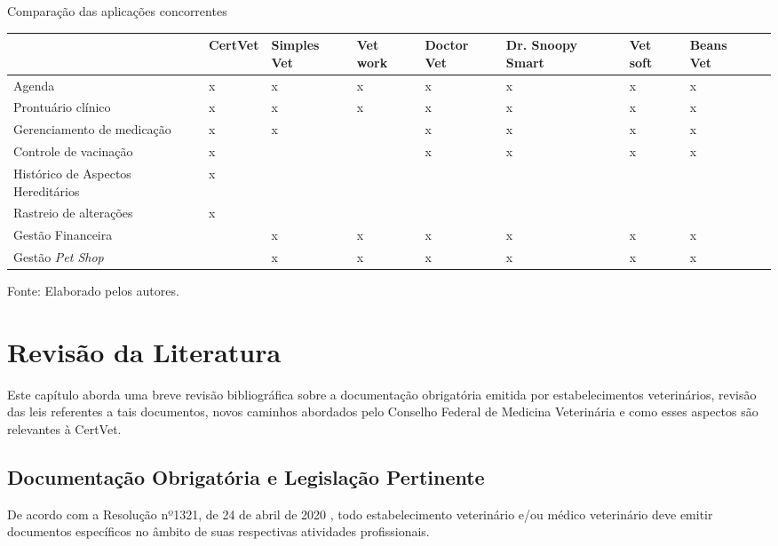 \documentclass[
    12pt,               %
    openright,          %
    oneside,
    a4paper,            %
    BIBLATEX,           %
    TODO,               %
    english,            %
    brazil              %
    ]{ifsp-spo-inf-ctds}
\begin{document}
    \begin{center}
    \begin{quadro}[H]
     \caption{Comparação das aplicações concorrentes}
    \label{tab:comparativa}
    \begin{tabulary}{1.0\textwidth}{|L|L|L|L|L|L|L|L|L|}
    \hline
     & CertVet & Simples Vet & Vet work & Doctor Vet & Dr. Snoopy Smart & Vet soft & Beans Vet\\
    \hline
    Agenda & x & x & x & x & x & x & x\\
    \hline
    Prontuário clínico & x & x & x & x & x & x & x\\
    \hline
    Gerenciamento de medicação & x & x &  & x & x & x & x\\
    \hline
    Controle de vacina\c{c}ão & x &  &  & x & x & x & x\\
    \hline
    Histórico de Aspectos Hereditários & x &  &  &  &  &  & \\
    \hline
    Rastreio de alterações & x &  &  &  &  &  & \\
    \hline
    Gestão Financeira &  & x & x & x & x & x & x\\
    \hline
    Gestão \emph{Pet Shop} &  & x & x & x & x & x & x\\
    \hline
    \end{tabulary}
    \centering
    {\footnotesize Fonte: Elaborado pelos autores.}
    \end{quadro}
\end{center}

\chapter[Revisão de Literatura]{Revisão da Literatura} \label{revisao_lit}

    Este capítulo aborda uma breve revisão bibliográfica sobre a documentação obrigatória emitida por estabelecimentos veterinários, revisão das leis referentes a tais documentos, novos caminhos abordados pelo Conselho Federal de Medicina Veterinária e como esses aspectos são relevantes à CertVet.


    \section{Documentação Obrigatória e Legislação Pertinente}

        De acordo com a Resolução nº1321, de 24 de abril de 2020 , todo estabelecimento veterinário e/ou médico veterinário deve emitir documentos específicos no âmbito de suas respectivas atividades profissionais.
\end{document}
